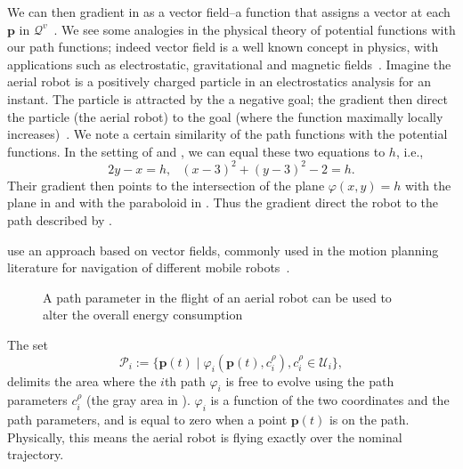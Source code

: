 We can then gradient in  as a vector field--a function that assigns a vector at each $\mathbf{p}$ in $\mathcal{Q}^v$~\citep{lavalle2006planning,choset2005principles}. We see some analogies in the physical theory of potential functions with our path functions; indeed vector field is a well known concept in physics, with applications such as electrostatic, gravitational and magnetic fields~\citep{feynman2015feynman}. Imagine the aerial robot is a positively charged particle in an electrostatics analysis for an instant. The particle is attracted by the a negative goal; the gradient then direct the particle (the aerial robot) to the goal (where the function maximally locally increases)~\citep{choset2005principles}. We note a certain similarity of the path functions with the potential functions. In the setting of  and , we can equal these two equations to $h$, i.e., 
\begin{equation}\label{eq:two-paths}
  2y-x=h,\,\,\,\ (x-3)^2+(y-3)^2-2=h.
\end{equation}
Their gradient then points to the intersection of the plane $\varphi(x,y)=h$ with the plane in  and with the paraboloid in . Thus the gradient direct the robot to the path described by .


use an approach based on vector fields, commonly used in the motion planning literature for navigation of different mobile robots~\citep{lindemann2005smoothly,gonccalves2010vector,panagou2014motion,zhou2014vector,kapitanyuk2017guiding,de2017guidance}.

\begin{figure}[h]
  \centering
  
  \caption[Path parameter in the flight of an aerial robot]{A path parameter in the flight of an aerial robot can be used to alter the overall energy consumption}
  \label{fig:tee1}
\end{figure}
%  

The set
\begin{equation}\label{eq:area}
  \mathcal{P}_i:=\{\mathbf{p}(t)\mid\varphi_i(\mathbf{p}(t),c_{i}^\rho),c_i^\rho\in\mathcal{U}_i\},
\end{equation}
delimits the area where the $i$th path $\varphi_i$ is free to evolve using the path parameters $c_i^\rho$ (the gray area in ). $\varphi_i$ is a function of the two coordinates and the path parameters, and is equal to zero when a point $\mathbf{p}(t)$ is on the path. Physically, this means the aerial robot is flying exactly over the nominal trajectory. 

